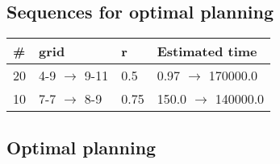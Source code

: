 \documentclass{article}
\begin{document}
                            \subsection*{Sequences for optimal planning}

                            \begin{center}
                            \begin{tabular}{@{}l|l|l|l@{}}
                            \# & grid & r & Estimated time\\\midrule
                            20&4-9 $\rightarrow$ 9-11&0.5&0.97 $\rightarrow$ 170000.0\\
10&7-7 $\rightarrow$ 8-9&0.75&150.0 $\rightarrow$ 140000.0
                            \end{tabular}
                            \end{center}
                    
                                \subsection*{Optimal planning}
                                
\end{document}
